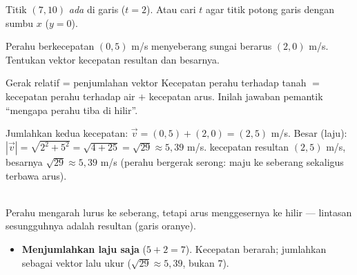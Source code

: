 \begin{variasi}
Titik $(7,10)$ \emph{ada} di garis ($t=2$). Atau cari $t$ agar titik potong garis
dengan sumbu $x$ ($y=0$).
\end{variasi}

\begin{soalbox}{}
Perahu berkecepatan $(0,5)$ m/s menyeberang sungai berarus $(2,0)$ m/s. Tentukan
vektor kecepatan resultan dan besarnya.
\end{soalbox}

\begin{ingat}{Gerak relatif = penjumlahan vektor}
Kecepatan perahu terhadap tanah $=$ kecepatan perahu terhadap air $+$ kecepatan
arus. Inilah jawaban pemantik ``mengapa perahu tiba di hilir''.
\end{ingat}

\jawab
{} Jumlahkan kedua kecepatan:
$\vec v=(0,5)+(2,0)=(2,5)$ m/s.
 Besar (laju): $|\vec v|=\sqrt{2^2+5^2}=\sqrt{4+25}=\sqrt{29}
\approx5{,}39$ m/s.
\jadi kecepatan resultan $(2,5)$ m/s, besarnya $\sqrt{29}\approx5{,}39$ m/s
(perahu bergerak serong: maju ke seberang sekaligus terbawa arus).

\begin{center}
\\
{\small Perahu mengarah lurus ke seberang, tetapi arus menggesernya ke hilir ---
lintasan sesungguhnya adalah resultan (garis oranye).}
\end{center}

\begin{jebakan}
\begin{itemize}[leftmargin=*,topsep=2pt]
  \item \textbf{Menjumlahkan laju saja} ($5+2=7$). Kecepatan berarah; jumlahkan
  sebagai vektor lalu ukur ($\sqrt{29}\approx5{,}39$, bukan $7$).
\end{itemize}
\end{jebakan}

